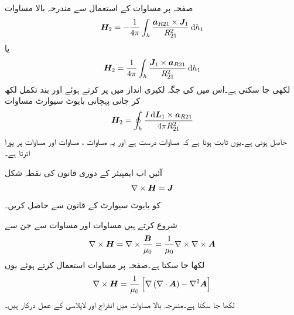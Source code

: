 صفحہ  پر مساوات  کے استعمال سے مندرجہ بالا مساوات
\begin{align*}
\kvec{H}_2=-\frac{1}{4\pi}  \int_h \frac{\kvec{a}_{R21} \times \kvec{J}_1}{R_{21}^2}\dif h_1
\end{align*}
یا
\begin{align*}
\kvec{H}_2=\frac{1}{4\pi}  \int_h \frac{\kvec{J}_1 \times \kvec{a}_{R21} }{R_{21}^2}\dif h_1
\end{align*}
لکھی جا سکتی ہے۔اس میں  کی جگہ لکیری انداز میں  پر کرتے ہوئے اور بند تکمل لکھ کر جانی پہچانی بایوٹ سیوارٹ مساوات
\begin{align*}
\kvec{H}_2= \oint_h \frac{I \dif \kvec{L}_1 \times \kvec{a}_{R21} }{4\pi R_{21}^2}
\end{align*}
حاصل ہوتی ہے۔یوں ثابت ہوتا ہے کہ مساوات  درست ہے اور یہ مساوات ، مساوات  اور مساوات  پر پورا اترتا ہے۔


آئیں اب ایمپیئر کے دوری قانون کی نقطہ شکل
\begin{align}
\nabla \times {\ensuremath{{\boldsymbol{H}}}}={{\boldsymbol{J}}}
\end{align}
کو بایوٹ سیوارٹ کے قانون سے حاصل کریں۔

شروع کرتے ہیں مساوات  اور مساوات  سے جن سے
\begin{align}
\nabla \times {\ensuremath{{\boldsymbol{H}}}}=\nabla \times \frac{{{\boldsymbol{B}}}}{\mu_0}=\frac{1}{\mu_0} \nabla \times \nabla \times {\ensuremath{{\boldsymbol{A}}}}
\end{align}
لکھا جا سکتا ہے۔صفحہ  پر مساوات  استعمال کرتے ہوئے یوں
\begin{align}\label{مساوات_مقناطیسی_مقناطیسی_میدان_کے_شدت_کی_گردش}
\nabla \times {\ensuremath{{\boldsymbol{H}}}}=\frac{1}{\mu_0} \left[\nabla \left(\nabla \cdot {\ensuremath{{\boldsymbol{A}}}} \right)-\nabla^2 {{\boldsymbol{A}}} \right]
\end{align}
لکھا جا سکتا ہے۔مندرجہ بالا مساوات میں انفراج اور لاپلاسی کے عمل درکار ہیں۔


